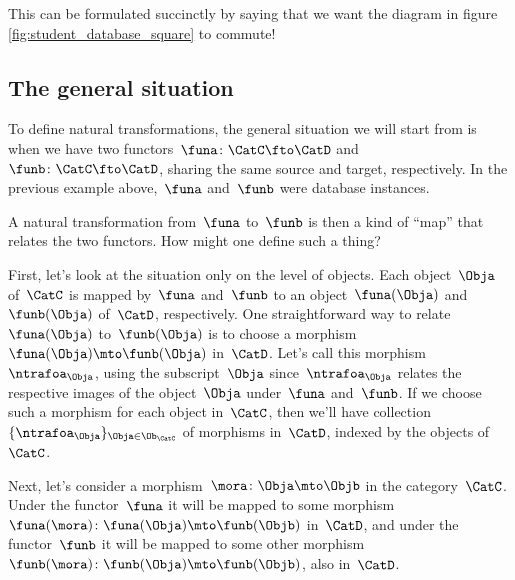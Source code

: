 %
\begin{marginfigure}
    \centering
    \caption{}
    \label{fig:student_database_square}
\end{marginfigure}
%

This can be formulated succinctly by saying that we want the diagram in figure \cref{fig:student_database_square} to commute!

\subsection{The general situation}

To define natural transformations, the general situation we will start from is when we have two functors~$\funa \colon \CatC \fto \CatD$  and~$\funb \colon \CatC \fto \CatD$, sharing the same source and target, respectively.
In the previous example above,~$\funa$ and~$\funb$ were database instances.

A natural transformation from~$\funa$ to~$\funb$ is then a kind of ``map'' that relates the two functors.
How might one define such a thing?

First, let's look at the situation only on the level of objects.
Each object~$\Obja$ of~$\CatC$ is mapped by~$\funa$ and~$\funb$ to an object~$\funa(\Obja)$ and~$\funb(\Obja)$ of~$\CatD$, respectively.
One straightforward way to relate~$\funa(\Obja)$ to~$\funb(\Obja)$ is to choose a morphism~$\funa(\Obja) \mto \funb(\Obja)$ in~$\CatD$.
Let's call this morphism~$\ntrafoa_{\Obja}$, using the subscript~$\Obja$ since~$\ntrafoa_{\Obja}$ relates the respective images of the object~$\Obja$ under~$\funa$ and~$\funb$.
If we choose such a morphism for each object in~$\CatC$, then we'll have collection~$\{ \ntrafoa_\Obja \}_{\Obja \in \Ob_\CatC}$ of morphisms in~$\CatD$, indexed by the objects of~$\CatC$.

Next, let's consider a morphism~$\mora \colon \Obja \mto \Objb$ in the category~$\CatC$.
Under the functor~$\funa$ it will be mapped to some morphism~$\funa(\mora)\colon \funa(\Obja) \mto \funb(\Objb)$ in~$\CatD$, and under the functor~$\funb$ it will be mapped to some other morphism~$\funb(\mora)\colon \funb(\Obja) \mto \funb(\Objb)$, also in~$\CatD$.

%
\begin{figure}[h!]
    \begin{center}
        \caption{
            \label{fig:two-functors-diagram}}
    \end{center}
\end{figure}
%

